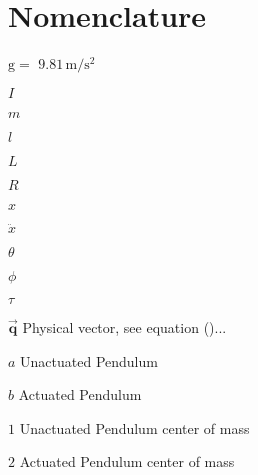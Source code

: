 \chapter{Nomenclature}

\begin{Nomencl}
   \item[$\mathrm{g} = $] $\mathrm{9.81\,m/s^2}$

 	\item[$I$]         
 	\item[$m$]         
 	\item[$l$]         
	\item[$L$]         
  	\item[$R$]
   	\item[$x$]         	
   	\item[$\ddot{x}$]  	\\
   	\item[$\theta$]    	
   	\item[$\phi$]    	
   	\item[$\tau$]      	

   \item[$\overrightarrow{\bm{q}}$] Physical vector, see equation ()...

   \item[$a$] 			Unactuated Pendulum
   \item[$b$]          	Actuated Pendulum
   \item[$1$]          	Unactuated Pendulum center of mass
   \item[$2$]          	Actuated Pendulum center of mass
\end{Nomencl}



\endinput
